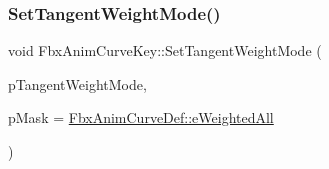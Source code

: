 \mbox{\label{class_fbx_anim_curve_key_a418159da0643ccdbeb5aa59b69b821e0}} 
\subsubsection{\texorpdfstring{Set\+Tangent\+Weight\+Mode()}{SetTangentWeightMode()}}
{\footnotesize\ttfamily void Fbx\+Anim\+Curve\+Key\+::\+Set\+Tangent\+Weight\+Mode (\begin{DoxyParamCaption}\item[{\hyperlink{class_fbx_anim_curve_def_aeee6e9cc12501e10dbd3e5caaf66990e}{Fbx\+Anim\+Curve\+Def\+::\+E\+Weighted\+Mode}}]{p\+Tangent\+Weight\+Mode,  }\item[{\hyperlink{class_fbx_anim_curve_def_aeee6e9cc12501e10dbd3e5caaf66990e}{Fbx\+Anim\+Curve\+Def\+::\+E\+Weighted\+Mode}}]{p\+Mask = {\ttfamily \hyperlink{class_fbx_anim_curve_def_aeee6e9cc12501e10dbd3e5caaf66990ea4337e6853fab642c2a432ab1bb303922}{Fbx\+Anim\+Curve\+Def\+::e\+Weighted\+All}} }\end{DoxyParamCaption})\hspace{0.3cm}{\ttfamily [inline]}}

